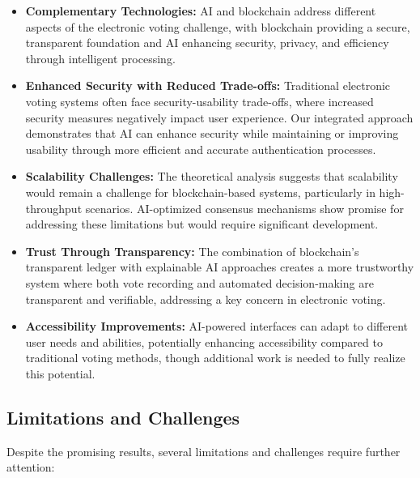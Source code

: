 \documentclass[conference]{IEEEtran}
\begin{document}
\begin{itemize}
    \item \textbf{Complementary Technologies:} AI and blockchain address different aspects of the electronic voting challenge, with blockchain providing a secure, transparent foundation and AI enhancing security, privacy, and efficiency through intelligent processing.
    
    \item \textbf{Enhanced Security with Reduced Trade-offs:} Traditional electronic voting systems often face security-usability trade-offs, where increased security measures negatively impact user experience. Our integrated approach demonstrates that AI can enhance security while maintaining or improving usability through more efficient and accurate authentication processes.
    
    \item \textbf{Scalability Challenges:} The theoretical analysis suggests that scalability would remain a challenge for blockchain-based systems, particularly in high-throughput scenarios. AI-optimized consensus mechanisms show promise for addressing these limitations but would require significant development.
    
    \item \textbf{Trust Through Transparency:} The combination of blockchain's transparent ledger with explainable AI approaches creates a more trustworthy system where both vote recording and automated decision-making are transparent and verifiable, addressing a key concern in electronic voting.
    
    \item \textbf{Accessibility Improvements:} AI-powered interfaces can adapt to different user needs and abilities, potentially enhancing accessibility compared to traditional voting methods, though additional work is needed to fully realize this potential.
\end{itemize}

\subsection{Limitations and Challenges}
Despite the promising results, several limitations and challenges require further attention:
\end{document}
